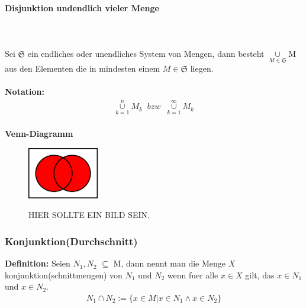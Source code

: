 \documentclass[../AbiMappe_Mathe.tex]{subfiles}
\begin{document}
\paragraph{Disjunktion undendlich vieler Menge}
		\hspace{0 cm} \\ \noindent \\
		Sei $\mathfrak{S}$ ein endliches oder unendliches System von Mengen, dann besteht $\underset{M \in \mathfrak{S}}{\cup}$M aus den Elementen die in mindesten einem $M \in  \mathfrak{S}$ liegen.\\\\
\textbf{Notation:}\\
\begin{align*}
\underset{k=1}{\overset{n}{\cup}}M_k \;\;bzw\;\; \underset{k=1}{\overset{\infty}{\cup}}M_k
\end{align*}\\
\textbf{Venn-Diagramm}
\begin{figure}[H]
\centering
\includegraphics[width=117px, height=85.5px]{VennDis.png}

HIER SOLLTE EIN BILD SEIN.
\end{figure}
\subsubsection{Konjunktion(Durchschnitt)}
\textbf{Definition:} Seien $N_1,N_2$ $\subseteq$ M, dann nennt man die Menge $X$ konjunktion(schnittmengen) von $N_1$ und  $N_2$ wenn fuer alle $x \in X$ gilt, das $x \in N_1$ und $x \in N_2$.
\begin{align*}
N_1 \cap N_2:=\{x \in M| x \in N_1 \land x \in N_2 \}
\end{align*}\\
\end{document}
